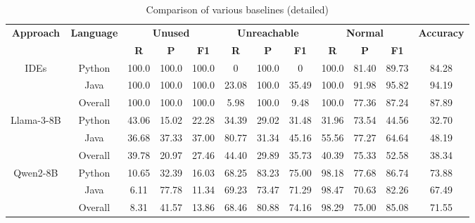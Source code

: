 \documentclass[11pt]{article}
\begin{document}
\begin{table}[h!]
\centering
\renewcommand{\arraystretch}{1.15} %
\setlength{\tabcolsep}{3.5pt} %
\small
\caption{Comparison of various baselines (detailed)}
\begin{tabular}{c  c ccc ccc ccc c}
\toprule
\multirow{2}{*}{\textbf{Approach}} & \multirow{2}{*}{\textbf{Language}}  & \multicolumn{3}{c}{\textbf{Unused}} & \multicolumn{3}{c}{\textbf{Unreachable}} & \multicolumn{3}{c}{\textbf{Normal}} & \multirow{2}{*}{\textbf{Accuracy}} \\
\cmidrule(lr){3-11}

 &  & \textbf{R} & \textbf{P} & \textbf{F1} & \textbf{R} & \textbf{P} & \textbf{F1} & \textbf{R} & \textbf{P} & \textbf{F1} & \\
\midrule

\multirow{3}{*}{IDEs} & Python  & 100.0 & 100.0 & 100.0 & 0 & 100.0 & 0  & 100.0 & 81.40 & 89.73 & 84.28\\
 & Java  & 100.0 & 100.0 & 100.0 & 23.08 & 100.0 & 35.49  & 100.0 & 91.98 & 95.82 & 94.19\\
 & \cellcolor{gray!20}Overall  & \cellcolor{gray!20}100.0 & \cellcolor{gray!20}100.0 & \cellcolor{gray!20}100.0 & \cellcolor{gray!20}5.98 & \cellcolor{gray!20}100.0 & \cellcolor{gray!20}9.48 &  \cellcolor{gray!20}100.0 & \cellcolor{gray!20}77.36 & \cellcolor{gray!20}87.24 & \cellcolor{gray!20}87.89\\

\midrule
\midrule

\multirow{3}{*}{Llama-3-8B} &Python   & 43.06 & 15.02 & 22.28 & 34.39 & 29.02 & 31.48 & 31.96 &  73.54 & 44.56 & 32.70\\
 & Java   & 36.68 & 37.33 & 37.00 & 80.77 & 31.34 & 45.16 & 55.56 & 77.27 & 64.64 & 48.19\\
 & \cellcolor{gray!20}Overall & \cellcolor{gray!20}39.78 & \cellcolor{gray!20}20.97 & \cellcolor{gray!20}27.46 & \cellcolor{gray!20}44.40 & \cellcolor{gray!20}29.89 & \cellcolor{gray!20}35.73 &\cellcolor{gray!20}40.39 & \cellcolor{gray!20}75.33 & \cellcolor{gray!20}52.58  & \cellcolor{gray!20}38.34 \\

\midrule

\multirow{3}{*}{Qwen2-8B} & Python  & 10.65 & 32.39 & 16.03 & 68.25 & 83.23 & 75.00 & 98.18 & 77.68 & 86.74 & 73.88\\
 & Java   & 6.11 & 77.78 & 11.34 & 69.23 & 73.47 & 71.29 & 98.47 & 70.63 & 82.26 & 67.49\\
 & \cellcolor{gray!20}Overall   & \cellcolor{gray!20}8.31 & \cellcolor{gray!20}41.57 & \cellcolor{gray!20}13.86 & \cellcolor{gray!20}68.46 & \cellcolor{gray!20}80.88 & \cellcolor{gray!20}74.16  & \cellcolor{gray!20}98.29 & \cellcolor{gray!20}75.00 & \cellcolor{gray!20}85.08 & \cellcolor{gray!20}71.55\\
\midrule


\end{tabular}
\end{table}
\end{document}
